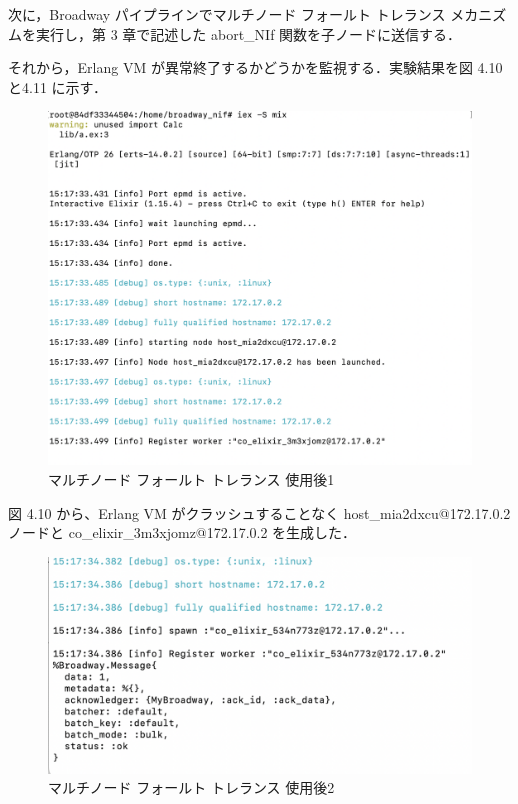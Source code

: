 \documentclass[a4paper]{jreport}	%
\begin{document}
次に，Broadway パイプラインでマルチノード フォールト トレランス メカニズムを実行し，第 3 章で記述した abort\_NIf 関数を子ノードに送信する．

それから，Erlang VM が異常終了するかどうかを監視する．実験結果を図 4.10と4.11 に示す．

\begin{figure}[H]
\vspace{8cm}
\begin{center}
\hspace{-8cm}
\includegraphics[scale=0.5]{ja/f12.png}
\end{center}
\caption{マルチノード フォールト トレランス 使用後1}
\end{figure}

図 4.10 から、Erlang VM がクラッシュすることなく host\_mia2dxcu@172.17.0.2 ノードと co\_elixir\_3m3xjomz@172.17.0.2 を生成した．

\begin{figure}[H]
\vspace{4cm}
\begin{center}
\hspace{-8cm}
\includegraphics[scale=0.5]{ja/f13.png}
\end{center}
\caption{マルチノード フォールト トレランス 使用後2}
\end{figure}
\end{document}
